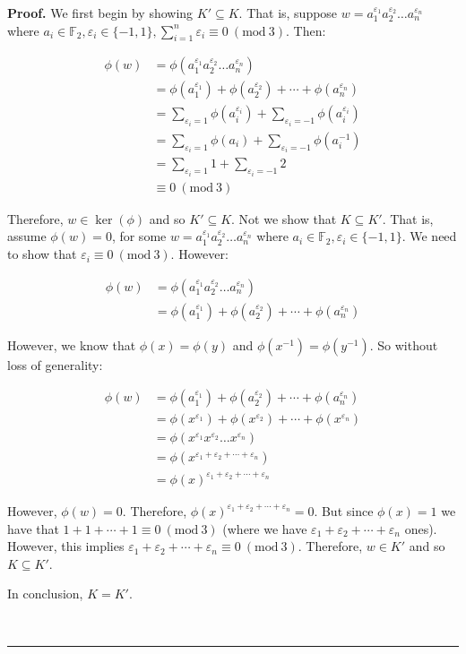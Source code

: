 \documentclass[12pt]{article}%
\newenvironment{proof}[1][Proof]{\textbf{#1.} }{\ \rule{0.5em}{0.5em}}
\newcommand{\F}{\mathbb{F}}
\newcommand{\Mod}[1]{\ (\mathrm{mod}\ #1)}
\begin{document}
\begin{proof}
We first begin by showing $K' \subseteq K$. That is, suppose
$w=a_{1}^{\varepsilon_1}a_{2}^{\varepsilon_2}\ldots a_{n}^{\varepsilon_n}$ where $a_i\in \F_2,
\varepsilon_i\in \{-1, 1\}, \sum_{i=1}^{n} \varepsilon_i \equiv 0 \Mod{3}$. Then:

\begin{align*}
\phi(w)
&=\phi(a_{1}^{\varepsilon_1}a_{2}^{\varepsilon_2}\ldots a_{n}^{\varepsilon_n}) \\
&=\phi(a_{1}^{\varepsilon_1})+\phi(a_{2}^{\varepsilon_2})+\cdots +\phi(a_{n}^{\varepsilon_n}) \\
&=\sum_{\varepsilon_i=1}  \phi(a_{i}^{\varepsilon_i})+\sum_{\varepsilon_i=-1}  \phi(a_{i}^{\varepsilon_i}) \\
&=\sum_{\varepsilon_i=1}  \phi(a_{i})+\sum_{\varepsilon_i=-1}  \phi(a_{i}^{-1}) \\
&=\sum_{\varepsilon_i=1}  1+\sum_{\varepsilon_i=-1}  2 \\
&\equiv 0 \Mod{3}
\end{align*}

Therefore, $w\in \ker(\phi)$ and so $K' \subseteq K$. Not we show that $K \subseteq K'$. That is, assume
$\phi(w)=0$, for some $w=a_{1}^{\varepsilon_1}a_{2}^{\varepsilon_2}\ldots a_{n}^{\varepsilon_n}$ where
$a_i\in \F_2, \varepsilon_i\in \{-1, 1\}$. We need to show that $\varepsilon_i \equiv 0 \Mod{3}$. However:

\begin{align*}
\phi(w)
&=\phi(a_{1}^{\varepsilon_1}a_{2}^{\varepsilon_2}\ldots a_{n}^{\varepsilon_n}) \\
&=\phi(a_{1}^{\varepsilon_1})+\phi(a_{2}^{\varepsilon_2})+\cdots +\phi(a_{n}^{\varepsilon_n}) 
\end{align*}

However, we know that $\phi(x)=\phi(y)$ and $\phi(x^{-1})=\phi(y^{-1})$. So without loss of generality:

\begin{align*}
\phi(w)
&=\phi(a_{1}^{\varepsilon_1})+\phi(a_{2}^{\varepsilon_2})+\cdots +\phi(a_{n}^{\varepsilon_n}) \\
&=\phi(x^{\varepsilon_1})+\phi(x^{\varepsilon_2})+\cdots +\phi(x^{\varepsilon_n}) \\
&=\phi(x^{\varepsilon_1}x^{\varepsilon_2}\ldots x^{\varepsilon_n}) \\
&=\phi(x^{\varepsilon_1+\varepsilon_2+\cdots +\varepsilon_n}) \\
&=\phi(x)^{\varepsilon_1+\varepsilon_2+\cdots +\varepsilon_n}
\end{align*}

However, $\phi(w)=0$. Therefore, $\phi(x)^{\varepsilon_1+\varepsilon_2+\cdots +\varepsilon_n}=0$. But
since $\phi(x)=1$ we have that $1+1+\cdots+1\equiv 0\Mod3$ (where we have
$\varepsilon_1+\varepsilon_2+\cdots +\varepsilon_n$ ones). However, this implies 
$\varepsilon_1+\varepsilon_2+\cdots +\varepsilon_n \equiv 0 \Mod{3}$. Therefore, $w\in K'$ and so 
$K\subseteq K'$.

In conclusion, $K=K'$.

\end{proof}
\end{document}
